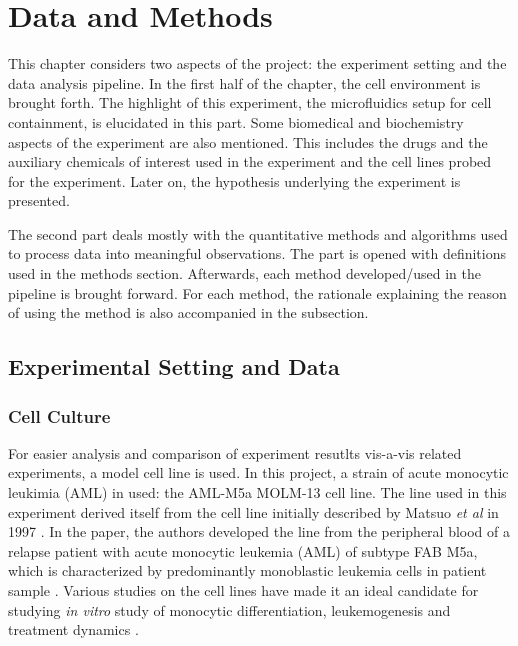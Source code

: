 \documentclass[pdftex,12pt,a4paper]{report}
\begin{document}
\lipsum[2]

\chapter{Data and Methods}

This chapter considers two aspects of the project: the experiment setting and the data analysis pipeline. In the first half of the chapter, the cell environment is brought forth. The highlight of this experiment, the microfluidics setup for cell containment, is elucidated in this part. Some biomedical and biochemistry aspects of the experiment are also mentioned. This includes the drugs and the auxiliary chemicals of interest used in the experiment and the cell lines probed for the experiment. Later on, the hypothesis underlying the experiment is presented.

The second part deals mostly with the quantitative methods and algorithms used to process data into meaningful observations. The part is opened with definitions used in the methods section. Afterwards, each method developed/used in the pipeline is brought forward. For each method, the rationale explaining the reason of using the method is also accompanied in the subsection.

\section{Experimental Setting and Data}

\subsection{Cell Culture}

For easier analysis and comparison of experiment resutlts vis-a-vis related experiments, a model cell line is used. In this project, a strain of acute monocytic leukimia (AML) in used: the AML-M5a MOLM-13 cell line. The line used in this experiment derived itself from the cell line initially described by Matsuo \textit{et al} in 1997 \cite{matsuo1997two}. In the paper, the authors developed the line from the peripheral blood of a relapse patient with acute monocytic leukemia (AML) of subtype FAB M5a, which is characterized by predominantly monoblastic leukemia cells in patient sample \cite{arber20162016}. Various studies on the cell lines have made it an ideal candidate for studying \textit{in vitro} study of monocytic differentiation, leukemogenesis and treatment dynamics \cite{matsuo1997two, kelly2002ct53518}.
\end{document}
